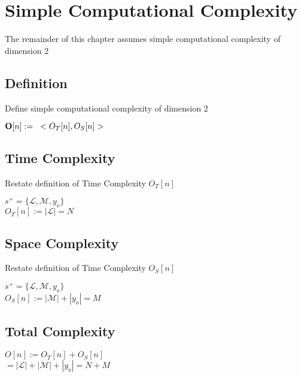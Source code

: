 \documentclass[11pt]{article}
\begin{document}
\newpage
\section{Simple Computational Complexity}
The remainder of this chapter assumes simple computational complexity of dimension 2

\subsection{Definition}
Define simple computational complexity of dimension 2
\begin{center}
$
\bold{O}[n] := \hspace{3mm} < O_T [n], O_S [n] >
$
\end{center}





\subsection{Time Complexity}
Restate definition of Time Complexity $O_T[n]$
\begin{center}
$
s^+ = \{ \mathcal{L},\mathcal{M},y_o\}
$
\\ \vspace{3mm}
$
O_T[n] := |\mathcal{L}| = N
$
\end{center}



\subsection{Space Complexity}
Restate definition of Time Complexity $O_S[n]$
\begin{center}
$
s^+ = \{ \mathcal{L},\mathcal{M},y_o\}
$
\\ \vspace{2mm}
$
O_S[n] := |\mathcal{M}| + |y_o| = M
$
\end{center}





\subsection{Total Complexity}
\begin{center}
$O[n] := O_T[n] + O_S[n]$
\\ \vspace{2mm}
$= |\mathcal{L}| + |\mathcal{M}| + |y_o| = N + M$
\end{center}
\end{document}
